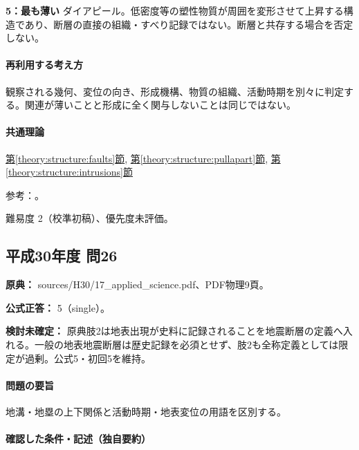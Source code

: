\noindent\textbf{5：最も薄い} ダイアピール。低密度等の塑性物質が周囲を変形させて上昇する構造であり、断層の直接の組織・すべり記録ではない。断層と共存する場合を否定しない。\par

\paragraph{再利用する考え方} 観察される幾何、変位の向き、形成機構、物質の組織、活動時期を別々に判定する。関連が薄いことと形成に全く関与しないことは同じではない。

\paragraph{共通理論} \hyperref[theory:structure:faults]{第\ref*{theory:structure:faults}節}, \hyperref[theory:structure:pullapart]{第\ref*{theory:structure:pullapart}節}, \hyperref[theory:structure:intrusions]{第\ref*{theory:structure:intrusions}節}

\par 参考：\cite{str_faultrocks,str_diapir}。

\par 難易度 2（校準初稿）、優先度未評価。

\subsection{平成30年度 問26}
\label{q:h30-reg-applied-26}

\noindent\textbf{原典：} sources/H30/17\_applied\_science.pdf、PDF物理9頁。

\textbf{公式正答：} 5（single）。

\par\textbf{検討未確定：} 原典肢2は地表出現が史料に記録されることを地震断層の定義へ入れる。一般の地表地震断層は歴史記録を必須とせず、肢2も全称定義としては限定が過剰。公式5・初回5を維持。

\paragraph{問題の要旨} 地溝・地塁の上下関係と活動時期・地表変位の用語を区別する。

\paragraph{確認した条件・記述（独自要約）}\mbox{}\par

